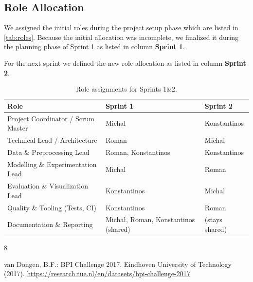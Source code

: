 \documentclass[runningheads]{llncs}
\begin{document}
\subsection{Role Allocation}

We assigned the initial roles during the project setup phase which are listed in \autoref{tab:roles}. Because the initial allocation was incomplete, we finalized it during the planning phase of Sprint 1 as listed in column \textbf{Sprint 1}.

For the next sprint we defined the new role allocation as listed in column \textbf{Sprint 2}.

\begin{table}[H]
    \caption{Role assignments for Sprints 1\&2.}\label{tab:roles}
    \centering
    \begin{tabular}{@{}lll@{}}
        \toprule
        \textbf{Role}                      & \textbf{Sprint 1}                     & \textbf{Sprint 2} \\
        \midrule
        Project Coordinator / Scrum Master & Michal                                & Konstantinos      \\
        Technical Lead / Architecture      & Roman                                 & Michal            \\
        Data \& Preprocessing Lead         & Roman, Konstantinos                   & Konstantinos      \\
        Modelling \& Experimentation Lead  & Michal                                & Roman             \\
        Evaluation \& Visualization Lead   & Konstantinos                          & Michal            \\
        Quality \& Tooling (Tests, CI)     & Konstantinos                          & Roman             \\
        Documentation \& Reporting         & Michał, Roman, Konstantinos  (shared) & (stays shared)    \\
        \bottomrule
    \end{tabular}
\end{table}


\begin{thebibliography}{8}

    van Dongen, B.F.: BPI Challenge 2017. Eindhoven University of Technology (2017). \url{https://research.tue.nl/en/datasets/bpi-challenge-2017}



\end{thebibliography}
\end{document}

